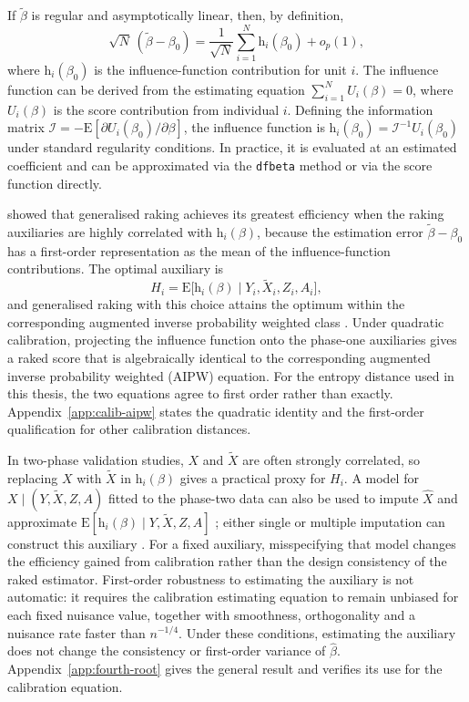 If $\tilde{\beta}$ is regular and asymptotically linear, then, by definition,
\begin{equation}
    \sqrt{N}\,(\tilde{\beta} - \beta_0)
    = \frac{1}{\sqrt{N}} \sum_{i=1}^{N} \mathrm{h}_i(\beta_0)
    + o_p(1),
    \label{eq:al_rep}
\end{equation}
where $\mathrm{h}_i(\beta_0)$ is the influence-function contribution for unit $i$. The influence function can be derived from the estimating equation $\sum_{i=1}^{N} U_i(\beta) = 0$, where $U_i(\beta)$ is the score contribution from individual $i$. Defining the information matrix $\mathcal{I} = -\mathrm{E}[\partial U_i(\beta_0) / \partial \beta]$, the influence function is $\mathrm{h}_i(\beta_0) = \mathcal{I}^{-1} U_i(\beta_0)$ under standard regularity conditions. In practice, it is evaluated at an estimated coefficient and can be approximated via the \texttt{dfbeta} method \citep{therneau2000cox} or via the score function directly.

\citet{breslow2009improved} showed that generalised raking achieves its greatest efficiency when the raking auxiliaries are highly correlated with $\mathrm{h}_i(\beta)$, because the estimation error $\tilde{\beta}-\beta_0$ has a first-order representation as the mean of the influence-function contributions. The optimal auxiliary is
\begin{equation}
    H_i = \mathrm{E}\bigl[\mathrm{h}_i(\beta)
    \mid Y_i, \tilde{X}_i, Z_i, A_i\bigr],
    \label{eq:optimal_aux}
\end{equation}
and generalised raking with this choice attains the optimum within the corresponding augmented inverse probability weighted class \citep{lumley2011connections}. Under quadratic calibration, projecting the influence function onto the phase-one auxiliaries gives a raked score that is algebraically identical to the corresponding augmented inverse probability weighted (AIPW) equation. For the entropy distance used in this thesis, the two equations agree to first order rather than exactly. Appendix~\ref{app:calib-aipw} states the quadratic identity and the first-order qualification for other calibration distances.

In two-phase validation studies, $X$ and $\tilde{X}$ are often strongly correlated, so replacing $X$ with $\tilde{X}$ in $\mathrm{h}_i(\beta)$ gives a practical proxy for $H_i$. A model for $X \mid (Y, \tilde{X}, Z, A)$ fitted to the phase-two data can also be used to impute $\hat{X}$ and approximate $\mathrm{E}[\mathrm{h}_i(\beta) \mid Y, \tilde{X}, Z, A]$ \citep{kulich2004improving}; either single or multiple imputation can construct this auxiliary \citep{han2021combining}. For a fixed auxiliary, misspecifying that model changes the efficiency gained from calibration rather than the design consistency of the raked estimator. First-order robustness to estimating the auxiliary is not automatic: it requires the calibration estimating equation to remain unbiased for each fixed nuisance value, together with smoothness, orthogonality and a nuisance rate faster than $n^{-1/4}$. Under these conditions, estimating the auxiliary does not change the consistency or first-order variance of $\hat{\beta}$. Appendix~\ref{app:fourth-root} gives the general result and verifies its use for the calibration equation.

